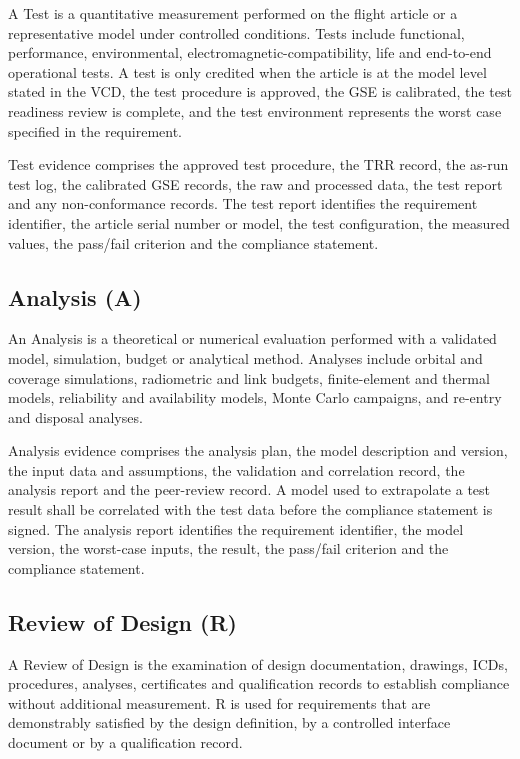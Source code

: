 A Test is a quantitative measurement performed on the flight article or a representative model under controlled conditions. Tests include functional, performance, environmental, electromagnetic-compatibility, life and end-to-end operational tests. A test is only credited when the article is at the model level stated in the VCD, the test procedure is approved, the GSE is calibrated, the test readiness review is complete, and the test environment represents the worst case specified in the requirement.

Test evidence comprises the approved test procedure, the TRR record, the as-run test log, the calibrated GSE records, the raw and processed data, the test report and any non-conformance records. The test report identifies the requirement identifier, the article serial number or model, the test configuration, the measured values, the pass/fail criterion and the compliance statement.

\subsection{Analysis (A)}

An Analysis is a theoretical or numerical evaluation performed with a validated model, simulation, budget or analytical method. Analyses include orbital and coverage simulations, radiometric and link budgets, finite-element and thermal models, reliability and availability models, Monte Carlo campaigns, and re-entry and disposal analyses.

Analysis evidence comprises the analysis plan, the model description and version, the input data and assumptions, the validation and correlation record, the analysis report and the peer-review record. A model used to extrapolate a test result shall be correlated with the test data before the compliance statement is signed. The analysis report identifies the requirement identifier, the model version, the worst-case inputs, the result, the pass/fail criterion and the compliance statement.

\subsection{Review of Design (R)}

A Review of Design is the examination of design documentation, drawings, ICDs, procedures, analyses, certificates and qualification records to establish compliance without additional measurement. R is used for requirements that are demonstrably satisfied by the design definition, by a controlled interface document or by a qualification record.

